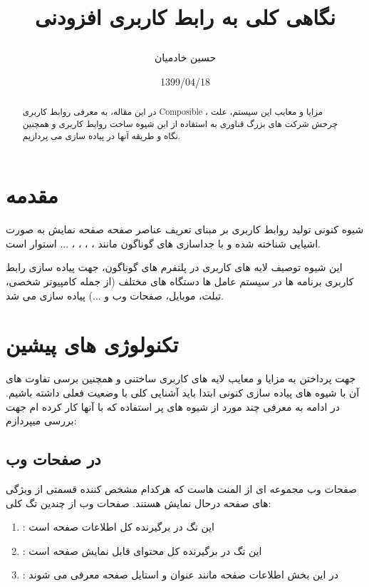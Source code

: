 \documentclass{CSICC2020}
\title{
\lr{Overview on Composable UI}

نگاهی کلی به رابط کاربری افزودنی
}
\date{1399/04/18}
\author[1]{حسین خادمیان}
\affil[1]{
دانشجوی کارشناسی، مهندسی کامپیوتر، دانشگاه شیراز ، شیراز،
me@hkhademia.ir
}
\begin{document}
\maketitle
\begin{abstract}
در این مقاله، به معرفی روابط کاربری Composible ، مزایا و معایب این سیستم، علت چرخش شرکت های بزرگ فناوری به استفاده از این شیوه ساخت روابط کاربری و همچنین نگاه و طریقه آنها در پیاده سازی می پردازیم.
 \end{abstract}
\begin{keywords}
\end{keywords}

\section{مقدمه}
شیوه کنونی تولید روابط کاربری بر مبنای تعریف عناصر صفحه صفحه نمایش به صورت اشیایی شناخته شده و با جداسازی  های گوناگون مانند ، ، ، ، ... استوار است.

این شیوه توصیف لایه های کاربری در پلتفرم های گوناگون، جهت پیاده سازی رابط کاربری برنامه ها در سیستم عامل ها دستگاه های مختلف (از جمله کامپیوتر شخصی، تبلت، موبایل، صفحات وب و ...) پیاده سازی می شد.


\section{تکنولوژی های پیشین}
\label{History}
جهت پرداختن به مزایا و معایب لایه های کاربری ساختنی و همچنین برسی تفاوت های آن با شیوه های پیاده سازی کنونی ابتدا باید آشنایی کلی با وضعیت فعلی داشته باشیم.
در ادامه به معرفی چند مورد از شیوه های پر استفاده که با آنها کار کرده ام جهت بررسی میپردازم:

\subsection{ در صفحات وب}
\label{HTML}
صفحات وب مجموعه ای از المنت هاست \cite{htmlwiki} که هرکدام مشخص کننده قسمتی از ویژگی های صفحه درحال نمایش هستند. صفحات وب از چندین تگ کلی:
\begin{enumerate} 
\item {}: این تگ در برگیرنده کل اطلاعات صفحه است
\item {}: این تگ در برگیرنده کل محتوای قابل نمایش صفحه است
\item {}: در این بخش اطلاعات صفحه مانند عنوان و استایل صفحه معرفی می شوند
\end{enumerate} 
\end{document}
